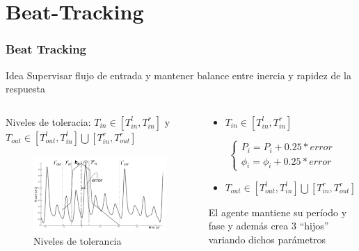 \documentclass[slidestop,compress,mathserif,xcolor=svgnames,table]{beamer}
\begin{document}
\section{Beat-Tracking}
\begin{frame}
\frametitle{Beat Tracking}
\begin{scriptsize}
\vspace*{-10pt}
\begin{block}{Idea}
Supervisar flujo de entrada y mantener balance entre inercia y rapidez de la respuesta
\end{block} \pause
\end{scriptsize}

\begin{columns}
\column{2in}
\vspace*{-10pt}
\begin{scriptsize}

Niveles de toleracia: $T_{in}\in[T_{in}^l,T_{in}^r]$ y $T_{out}\in[T_{out}^l,T_{in}^l] \bigcup [T_{in}^r,T_{out}^r]$

\begin{figure}[h!]
  \begin{center}
  \vspace*{-10pt}
  \includegraphics[width=.8\textwidth]{./pics/grafica.png}
  \end{center}
  \vspace{-10pt}
  \caption{Niveles de tolerancia}
  \label{fig:grafica}
\end{figure}
\pause
\end{scriptsize}
\column{2in}
\vspace*{-10pt}
\begin{scriptsize}

\begin{itemize} \item \textbf{$T_{in}\in[T_{in}^l,T_{in}^r]$} \end{itemize}
$$
\begin{cases}
P_i = P_i+0.25*error\\
\phi_i = \phi_i+0.25*error
\end{cases}
$$
\begin{itemize} \item \textbf{$T_{out}\in[T_{out}^l,T_{in}^l] \bigcup [T_{in}^r,T_{out}^r]$} \end{itemize}
El agente mantiene su período y fase y además crea 3 ``hijos'' variando dichos parámetros


\end{scriptsize}
\end{columns}
\end{frame}
\end{document}
